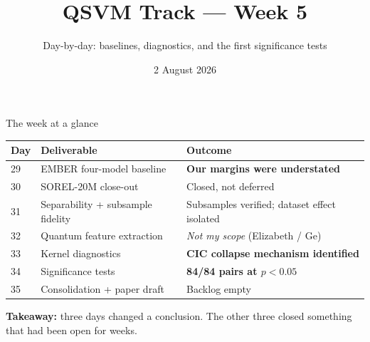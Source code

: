 \documentclass[aspectratio=169,11pt]{beamer}
\title{QSVM Track --- Week 5}
\subtitle{Day-by-day: baselines, diagnostics, and the first significance tests}
\date{2 August 2026}
\newcommand{\take}[1]{%
  \vspace{0.4em}\footnotesize\textbf{\color{blue!55!black}Takeaway:} #1}
\begin{document}
\begin{frame}[plain]
  \titlepage
\end{frame}

\begin{frame}{The week at a glance}
\small
\begin{tabular}{@{}llp{}@{}}
\toprule
\textbf{Day} & \textbf{Deliverable} & \textbf{Outcome} \\
\midrule
29 & EMBER four-model baseline & \textbf{Our margins were understated} \\
30 & SOREL-20M close-out & Closed, not deferred \\
31 & Separability + subsample fidelity & Subsamples verified; dataset effect isolated \\
32 & Quantum feature extraction & \emph{Not my scope} (Elizabeth / Ge) \\
33 & Kernel diagnostics & \textbf{CIC collapse mechanism identified} \\
34 & Significance tests & \textbf{84/84 pairs at $p<0.05$} \\
35 & Consolidation + paper draft & Backlog empty \\
\bottomrule
\end{tabular}

\take{three days changed a conclusion. The other three closed something that
had been open for weeks.}
\end{frame}
\end{document}
